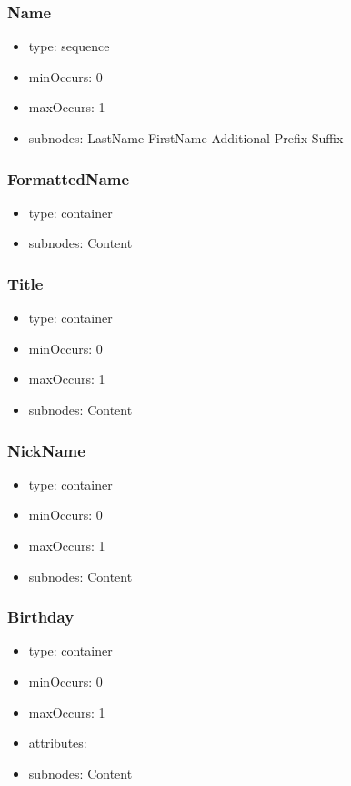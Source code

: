 \documentclass[a4paper,11pt]{article}
\begin{document}
\subsubsection{Name}
\begin{itemize}
  \item type: sequence
  \item minOccurs: 0
  \item maxOccurs: 1
  \item subnodes:
  \subitem LastName
  \subitem FirstName
  \subitem Additional
  \subitem Prefix
  \subitem Suffix
\end{itemize}

\subsubsection{FormattedName}
\begin{itemize}
  \item type: container
  \item subnodes:
  \subitem Content
\end{itemize}

\subsubsection{Title}
\begin{itemize}
  \item type: container
  \item minOccurs: 0
  \item maxOccurs: 1
  \item subnodes:
  \subitem Content
\end{itemize}

\subsubsection{NickName}
\begin{itemize}
  \item type: container
  \item minOccurs: 0
  \item maxOccurs: 1
  \item subnodes:
  \subitem Content
\end{itemize}

\subsubsection{Birthday}
\begin{itemize}
  \item type: container
  \item minOccurs: 0
  \item maxOccurs: 1
  \item attributes:
  \item subnodes:
  \subitem Content
\end{itemize}
\end{document}
